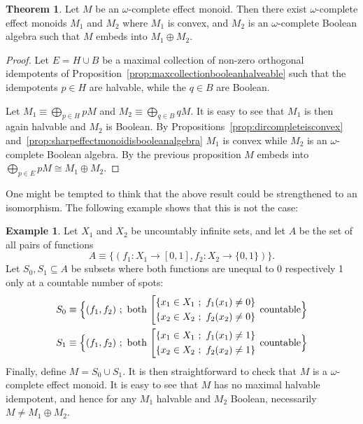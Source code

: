 \documentclass[10pt,conference]{IEEEtran}
\newcounter{counter}
\theoremstyle{definition}
\newtheorem{theorem}[counter]{Theorem}
\newtheorem{example}[counter]{Example}
\begin{document}
\begin{theorem}\label{thm:omegacompleteembed}
    Let $M$ be an $\omega$-complete effect monoid. Then there exist
    $\omega$-complete effect monoids $M_1$ and $M_2$ where
    $M_1$ is convex, and $M_2$ is an $\omega$-complete Boolean algebra
    such that $M$ embeds into $M_1\oplus M_2$.
\end{theorem}
\begin{proof}
    Let $E=H\cup B$ be a maximal collection of non-zero orthogonal idempotents of
    Proposition~\ref{prop:maxcollectionbooleanhalveable} such that the idempotents
    $p\in H$ are halvable, while the $q\in B$ are Boolean.

    Let $M_1 \equiv \bigoplus_{p\in H} pM$ and $M_2 \equiv \bigoplus_{q\in B} qM$.
    It is easy to see that $M_1$ is then again halvable and $M_2$ is Boolean.
    By Propositions~\ref{prop:dircompleteisconvex} and~\ref{prop:sharpeffectmonoidisbooleanalgebra} $M_1$ is convex while $M_2$ is an $\omega$-complete Boolean algebra.
    By the previous proposition $M$ embeds into 
    $\bigoplus_{p\in E}pM \cong M_1\oplus M_2$.
\end{proof}

One might be tempted to think that the above result could be strengthened to an isomorphism. The following example shows that this is not the case:

\begin{example}
    Let $X_1$ and $X_2$ be uncountably infinite sets, and let $A$ be the set of all pairs of functions 
    $$A \equiv \{(f_1:X_1\rightarrow [0,1], f_2: X_2\rightarrow \{0,1\})\}.$$
    Let $S_0, S_1\subseteq A$ be subsets where both functions are unequal to 0 respectively 1 only at a countable number of spots:
    \begin{align*}
    S_0 &\equiv \Bigl\{(f_1,f_2)~;~ \text{both\,} 
                \left[ \begin{aligned}
        \{x_1\in X_1~;~f_1(x_1)\neq 0\}\\
        \{x_2\in X_2~;~f_2(x_2)\neq 0\} 
                \end{aligned}\right.\text{\,countable}\Bigr\} \\
        S_1 &\equiv \Bigl\{(f_1,f_2)~;~ \text{both\,}
        \left[ \begin{aligned}
        \{x_1\in X_1~;~f_1(x_1)\neq 1\} \\
        \{x_2\in X_2~;~f_2(x_2)\neq 1\}\end{aligned} \right. \text{\,countable}\Bigr\}
    \end{align*}
    Finally, define $M = S_0\cup S_1$. It is then straightforward to check that $M$ is a $\omega$-complete effect monoid. It is easy to see that $M$ has no maximal halvable idempotent, and hence for any $M_1$ halvable and $M_2$ Boolean, necessarily ${M\neq M_1\oplus M_2}$.
\end{example}
\end{document}
